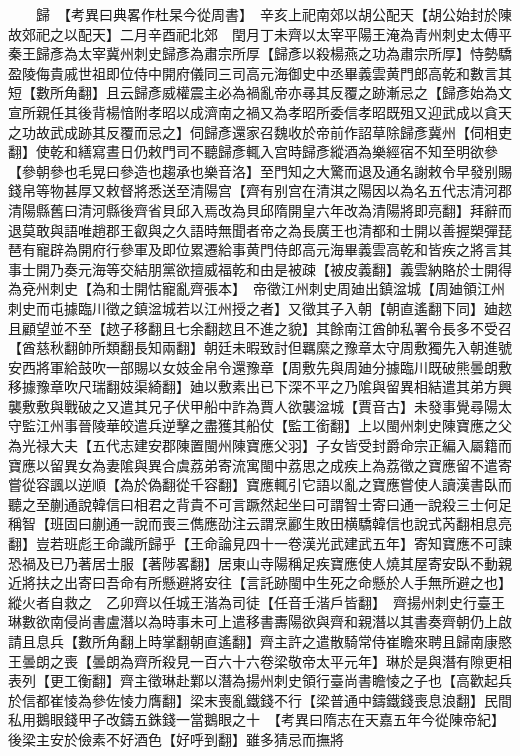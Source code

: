 　　歸　【考異曰典畧作杜杲今從周書】　辛亥上祀南郊以胡公配天【胡公始封於陳故郊祀之以配天】二月辛酉祀北郊　閏月丁未齊以太宰平陽王淹為青州刺史太傅平秦王歸彥為太宰冀州刺史歸彥為肅宗所厚【歸彥以殺楊燕之功為肅宗所厚】恃勢驕盈陵侮貴戚世祖即位侍中開府儀同三司高元海御史中丞畢義雲黄門郎高乾和數言其短【數所角翻】且云歸彥威權震主必為禍亂帝亦㝷其反覆之跡漸忌之【歸彥始為文宣所親任其後背楊愔附孝昭以成濟南之禍又為孝昭所委信孝昭既殂又迎武成以貪天之功故武成跡其反覆而忌之】伺歸彥還家召魏收於帝前作詔草除歸彥冀州【伺相吏翻】使乾和繕寫晝日仍敕門司不聽歸彥輒入宫時歸彥縱酒為樂經宿不知至明欲參【參朝參也毛晃曰參造也趨承也樂音洛】至門知之大驚而退及通名謝敕令早發别賜錢帛等物甚厚又敕督將悉送至清陽宫【齊有别宫在清淇之陽因以為名五代志清河郡清陽縣舊曰清河縣後齊省貝邱入焉改為貝邱隋開皇六年改為清陽將即亮翻】拜辭而退莫敢與語唯趙郡王叡與之久語時無聞者帝之為長廣王也清都和士開以善握槊彈琵琶有寵辟為開府行參軍及即位累遷給事黄門侍郎高元海畢義雲高乾和皆疾之將言其事士開乃奏元海等交結朋黨欲擅威福乾和由是被疎【被皮義翻】義雲納賂於士開得為兗州刺史【為和士開怙寵亂齊張本】　帝徵江州刺史周廸出鎮湓城【周廸領江州刺史而屯據臨川徵之鎮湓城若以江州授之者】又徵其子入朝【朝直遙翻下同】廸趑且顧望並不至【趑子移翻且七余翻趑且不進之貌】其餘南江酋帥私署令長多不受召【酋慈秋翻帥所類翻長知兩翻】朝廷未暇致討但羈縻之豫章太守周敷獨先入朝進號安西將軍給鼓吹一部賜以女妓金帛令還豫章【周敷先與周廸分據臨川既破熊曇朗敷移據豫章吹尺瑞翻妓渠綺翻】廸以敷素出已下深不平之乃隂與留異相結遣其弟方興襲敷敷與戰破之又遣其兄子伏甲船中詐為賈人欲襲湓城【賈音古】未發事覺尋陽太守監江州事晉陵華皎遣兵逆擊之盡獲其船仗【監工銜翻】上以閩州刺史陳寶應之父為光禄大夫【五代志建安郡陳置閩州陳寶應父羽】子女皆受封爵命宗正編入屬籍而寶應以留異女為妻隂與異合虞荔弟寄流寓閩中荔思之成疾上為荔徵之寶應留不遣寄嘗從容諷以逆順【為於偽翻從千容翻】寶應輒引它語以亂之寶應嘗使人讀漢書臥而聽之至蒯通說韓信曰相君之背貴不可言蹶然起坐曰可謂智士寄曰通一說殺三士何足稱智【班固曰蒯通一說而喪三儁應劭注云謂烹酈生敗田横驕韓信也說式芮翻相息亮翻】豈若班彪王命識所歸乎【王命論見四十一卷漢光武建武五年】寄知寶應不可諫恐禍及已乃著居士服【著陟畧翻】居東山寺陽稱足疾寶應使人燒其屋寄安臥不動親近將扶之出寄曰吾命有所懸避將安往【言託跡閩中生死之命懸於人手無所避之也】縱火者自救之　乙卯齊以任城王湝為司徒【任音壬湝戶皆翻】　齊揚州刺史行臺王琳數欲南侵尚書盧潛以為時事未可上遣移書夀陽欲與齊和親潛以其書奏齊朝仍上啟請且息兵【數所角翻上時掌翻朝直遙翻】齊主許之遣散騎常侍崔瞻來聘且歸南康愍王曇朗之喪【曇朗為齊所殺見一百六十六卷梁敬帝太平元年】琳於是與潛有隙更相表列【更工衡翻】齊主徵琳赴鄴以潛為揚州刺史領行臺尚書瞻㥄之子也【高歡起兵於信都崔㥄為參佐㥄力膺翻】梁末喪亂鐵錢不行【梁普通中鑄鐵錢喪息浪翻】民間私用鵝眼錢甲子改鑄五銖錢一當鵝眼之十　【考異曰隋志在天嘉五年今從陳帝紀】後梁主安於儉素不好酒色【好呼到翻】雖多猜忌而撫將

